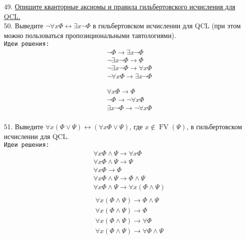 \documentclass[a4paper,100pt]{article}
\theoremstyle{indented}
\theoremstyle{definition}
\theoremstyle{remark}
\DeclareMathOperator{\FV}{FV}
\begin{document}
49. \hyperlink{b49}{Опишите кванторные аксиомы и правила гильбертовского исчисления для QCL.} \\

50. %
{Выведите $\neg \forall x \Phi \leftrightarrow \exists x \neg \Phi$ в гильбертовском исчислении для QCL (при этом можно пользоваться пропозициональными тавтологиями).} \\ 

\texttt{Идеи решения:}
\begin{align*}
  & \neg \Phi \to \exists x \neg \Phi\\
  & \neg \exists x \neg \Phi \to \Phi\\
  & \neg \exists x \neg \Phi \to \forall x \Phi\\
  & \neg \forall x \Phi \to \exists x \neg \Phi 
  \end{align*}

  \begin{align*}
    & \forall x \Phi\to \Phi\\
    & \neg \Phi \to \neg \forall x \Phi\\
    & \exists x \neg \Phi \to \neg \forall x \Phi\\
  \end{align*}

51. %
{Выведите $\forall x (\Phi \vee \Psi) \leftrightarrow (\forall x \Phi \vee \Psi)$, где $x \notin \FV (\Psi)$, в гильбертовском исчислении для QCL.} \\ 

\texttt{Идеи решения:}
\begin{align*}
  & \forall x \Phi \wedge \Psi\to\forall x \Phi\\
  & \forall x \Phi \wedge \Psi\to\Psi\\
  & \forall x \Phi \to \Phi\\
  & \forall x \Phi \wedge \Psi\to \Phi \wedge \Psi\\
  & \forall x \Phi \wedge \Psi\to \forall x (\Phi \wedge \Psi)\\
  \end{align*}
  \begin{align*}
    & \forall x(\Phi\wedge \Psi)\to\Phi\wedge \Psi\\
    & \forall x(\Phi\wedge \Psi)\to \Phi\\
    & \forall x(\Phi\wedge \Psi)\to \forall\Phi\\
    & \forall x(\Phi\wedge \Psi)\to \forall\Phi\wedge \Psi\\
  \end{align*}
\end{document}

